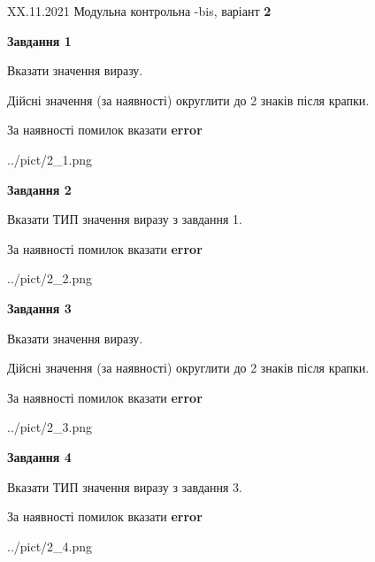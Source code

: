 \documentclass[11pt, ukrainian]{article}
\begin{document}
{XX.11.2021 Модульна контрольна -bis, варіант  \No \textbf { 2 }\par}
{
\begin {large}
{\begin {center}\textbf{Завдання 1}\end {center}}\par
Вказати значення виразу. \par
Дійсні значення (за наявності) округлити до 2 знаків після крапки. \par
За наявності помилок вказати \textbf{error}

\begin{center}
	{../pict/2_1.png}
\end{center}
\newpage

{\begin {center}\textbf{Завдання 2}\end {center}}\par
Вказати ТИП значення виразу з завдання 1. \par
За наявності помилок вказати \textbf{error}

\begin{center}
	{../pict/2_2.png}
\end{center}
\newpage

{\begin {center}\textbf{Завдання 3}\end {center}}\par
Вказати значення виразу. \par
Дійсні значення (за наявності) округлити до 2 знаків після крапки. \par
За наявності помилок вказати \textbf{error}

\begin{center}
	{../pict/2_3.png}
\end{center}
\newpage

{\begin {center}\textbf{Завдання 4}\end {center}}\par
Вказати ТИП значення виразу з завдання 3. \par
За наявності помилок вказати \textbf{error}

\begin{center}
	{../pict/2_4.png}
\end{center}
\newpage


\end{large}}
\end{document}

